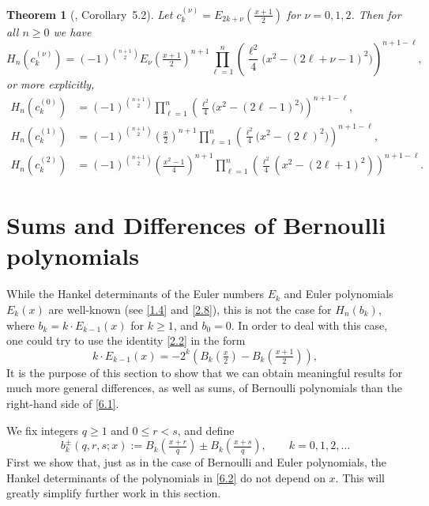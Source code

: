 \documentclass{amsart}
\theoremstyle{plain}
\newtheorem{theorem}{Theorem}[section]
\numberwithin{equation}{section}
\begin{document}
\begin{theorem}[\cite{DJ}, Corollary~5.2]\label{thm:2.4}
Let $c_k^{(\nu)}=E_{2k+\nu}(\frac{x+1}{2})$ for $\nu=0, 1, 2$. Then for all
$n\geq 0$ we have
\begin{equation}\label{2.14}
H_n(c_k^{(\nu)})=(-1)^{\binom{n+1}{2}}E_{\nu}(\tfrac{x+1}{2})^{n+1}
\prod_{\ell=1}^n\left(\frac{\ell^{2}}{4}\big(x^{2}-(2\ell+\nu-1)^{2}\big)\right)^{n+1-\ell},
\end{equation}
or more explicitly,
\begin{align}
H_n(c_k^{(0)}) &= (-1)^{\binom{n+1}{2}}\prod_{\ell=1}^n
\left(\frac{\ell^2}{4}\big(x^2-(2\ell-1)^2\big)\right)^{n+1-\ell},\label{2.15}\\
H_n(c_k^{(1)}) &= (-1)^{\binom{n+1}{2}}\left(\frac{x}{2}\right)^{n+1}
\prod_{\ell=1}^n\left(\frac{\ell^2}{4}\big(x^2-(2\ell)^2\big)\right)^{n+1-\ell},\label{2.16}\\
H_n(c_k^{(2)}) &= (-1)^{\binom{n+1}{2}}\left(\frac{x^{2}-1}{4}\right)^{n+1}
\prod_{\ell=1}^{n}\left(\frac{\ell^{2}}{4}(x^{2}-(2\ell+1)^{2})\right)^{n+1-\ell}.\label{2.17}
\end{align}
\end{theorem}

\section{Sums and Differences of Bernoulli polynomials}

While the Hankel determinants of the Euler numbers $E_k$ and Euler polynomials
$E_k(x)$ are well-known (see \eqref{1.4} and \eqref{2.8}), this is not the 
case for $H_n(b_k)$,
where $b_k=k\cdot E_{k-1}(x)$ for $k\geq 1$, and $b_0=0$. In order to deal with
this case, one could try to use the identity \eqref{2.2} in the form 
\begin{equation}\label{6.1}
k\cdot E_{k-1}(x) = -2^k\left(B_k(\tfrac{x}{2})-B_k(\tfrac{x+1}{2})\right),
\end{equation}
It is the purpose of this section to
show that we can obtain meaningful results for much more general differences,
as well as sums, of Bernoulli polynomials than the right-hand side of 
\eqref{6.1}.

We fix integers $q\geq 1$ and $0\leq r<s$, and define
\begin{equation}\label{6.2}
b_k^{\pm}(q,r,s;x) := B_k(\tfrac{x+r}{q})\pm B_k(\tfrac{x+s}{q}),
\qquad k=0, 1, 2,\ldots
\end{equation}
First we show that, just as in the case of Bernoulli and Euler polynomials,
the Hankel determinants of the polynomials in \eqref{6.2} do not depend on $x$.
This will greatly simplify further work in this section.
\end{document}
